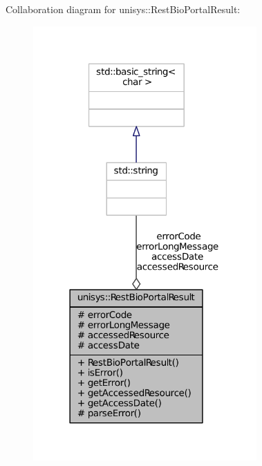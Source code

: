 Collaboration diagram for unisys\-:\-:Rest\-Bio\-Portal\-Result\-:
\nopagebreak
\begin{figure}[H]
\begin{center}
\leavevmode
\includegraphics[width=242pt]{classunisys_1_1RestBioPortalResult__coll__graph}
\end{center}
\end{figure}
